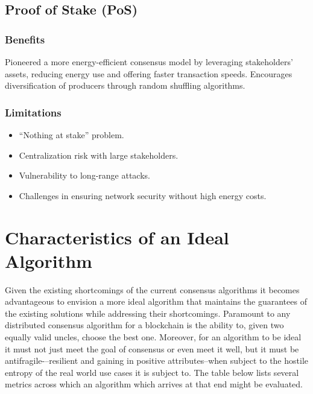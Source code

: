 \documentclass{article}
\begin{document}
\subsection{Proof of Stake (PoS)}
\subsubsection{Benefits}
Pioneered a more energy-efficient consensus model by leveraging stakeholders’
assets, reducing energy use and offering faster transaction speeds. Encourages
diversification of producers through random shuffling algorithms.
\subsubsection{Limitations}
\begin{itemize}
  \item \enquote{Nothing at stake} problem.
  \item Centralization risk with large stakeholders.
  \item Vulnerability to long-range attacks.
  \item Challenges in ensuring network security without high energy costs.
\end{itemize}

\section{Characteristics of an Ideal Algorithm}

Given the existing shortcomings of the current consensus algorithms it becomes
advantageous to envision a more ideal algorithm that maintains the guarantees
of the existing solutions while addressing their shortcomings. Paramount to any
distributed consensus algorithm for a blockchain is the ability to, given two
equally valid uncles, choose the best one. Moreover, for an algorithm to be
ideal it must not just meet the goal of consensus or even meet it well, but it
must be antifragile-–resilient and gaining in positive attributes--when subject
to the hostile entropy of the real world use cases it is subject to. The table
below lists several metrics across which an algorithm which arrives at that end
might be evaluated.
\end{document}
